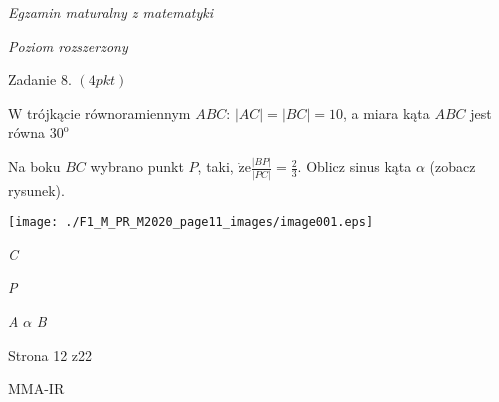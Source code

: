 \documentclass[a4paper,12pt]{article}
\begin{document}
{\it Egzamin maturalny z matematyki}

{\it Poziom rozszerzony}

Zadanie 8. $(4pkt)$

$\mathrm{W}$ trójkącie równoramiennym $ABC$: $|AC|=|BC|=10$, a miara kąta $ABC$ jest równa $30^{\mathrm{o}}$

Na boku $BC$ wybrano punkt $P$, taki, $\dot{\mathrm{z}}\mathrm{e} \displaystyle \frac{|BP|}{|PC|}=\frac{2}{3}$. Oblicz sinus kąta $\alpha$ (zobacz rysunek).
\begin{center}
\texttt{[image: ./F1\_M\_PR\_M2020\_page11\_images/image001.eps]}
\end{center}
{\it C}

{\it P}

{\it A}  $\alpha$  {\it B}

Strona 12 z22

MMA-IR
\end{document}
